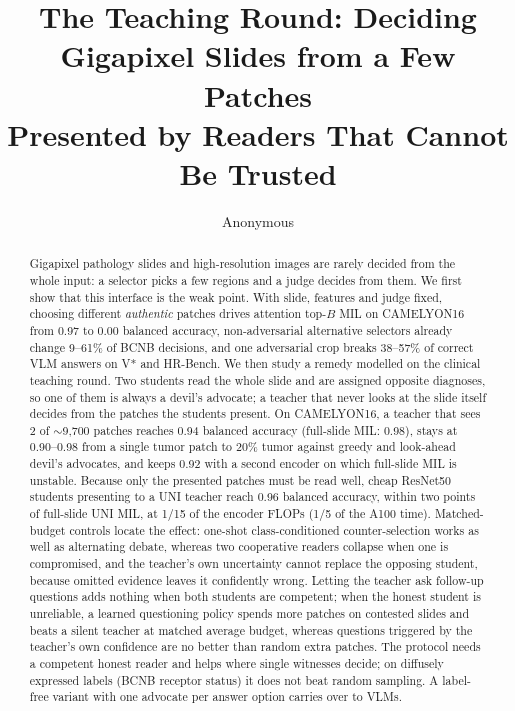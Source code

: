 \documentclass[10pt,twocolumn,letterpaper]{article}
\title{The Teaching Round: Deciding Gigapixel Slides from a Few Patches\\Presented by Readers That Cannot Be Trusted}
\author{Anonymous}
\begin{document}
\maketitle

\begin{abstract}
Gigapixel pathology slides and high-resolution images are rarely decided from the whole input: a selector picks a few regions and a judge decides from them. We first show that this interface is the weak point. With slide, features and judge fixed, choosing different \emph{authentic} patches drives attention top-$B$ MIL on CAMELYON16 from 0.97 to 0.00 balanced accuracy, non-adversarial alternative selectors already change 9--61\% of BCNB decisions, and one adversarial crop breaks 38--57\% of correct VLM answers on V* and HR-Bench. We then study a remedy modelled on the clinical teaching round. Two students read the whole slide and are assigned opposite diagnoses, so one of them is always a devil's advocate; a teacher that never looks at the slide itself decides from the patches the students present. On CAMELYON16, a teacher that sees 2 of $\sim$9{,}700 patches reaches 0.94 balanced accuracy (full-slide MIL: 0.98), stays at 0.90--0.98 from a single tumor patch to 20\% tumor against greedy and look-ahead devil's advocates, and keeps 0.92 with a second encoder on which full-slide MIL is unstable. Because only the presented patches must be read well, cheap ResNet50 students presenting to a UNI teacher reach 0.96 balanced accuracy, within two points of full-slide UNI MIL, at 1/15 of the encoder FLOPs (1/5 of the A100 time). Matched-budget controls locate the effect: one-shot class-conditioned counter-selection works as well as alternating debate, whereas two cooperative readers collapse when one is compromised, and the teacher's own uncertainty cannot replace the opposing student, because omitted evidence leaves it confidently wrong. Letting the teacher ask follow-up questions adds nothing when both students are competent; when the honest student is unreliable, a learned questioning policy spends more patches on contested slides and beats a silent teacher at matched average budget, whereas questions triggered by the teacher's own confidence are no better than random extra patches. The protocol needs a competent honest reader and helps where single witnesses decide; on diffusely expressed labels (BCNB receptor status) it does not beat random sampling. A label-free variant with one advocate per answer option carries over to VLMs.
\end{abstract}
\end{document}
